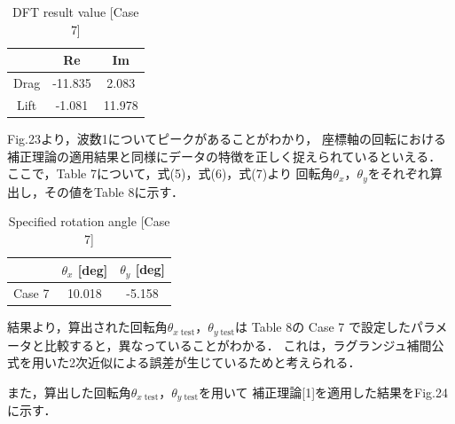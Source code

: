 \begin{table}[htbp]
  \begin{center}
    \caption{DFT result value [Case 7]}
    \begin{tabular}{|p{30mm}|p{20mm}|p{20mm}|}
      \hline
      \multicolumn{1}{|c|}{}     & \multicolumn{1}{|c|}{Re}      & \multicolumn{1}{|c|}{Im}     \\ \hline
      \multicolumn{1}{|c|}{Drag} & \multicolumn{1}{|c|}{-11.835} & \multicolumn{1}{|c|}{2.083}  \\ \hline
      \multicolumn{1}{|c|}{Lift} & \multicolumn{1}{|c|}{-1.081}  & \multicolumn{1}{|c|}{11.978} \\ \hline
    \end{tabular}
  \end{center}
\end{table}

\newpage
Fig.23より，波数1についてピークがあることがわかり，
座標軸の回転における補正理論の適用結果と同様にデータの特徴を正しく捉えられているといえる．
ここで，Table 7について，式(5)，式(6)，式(7)より
回転角$\theta_x$，$\theta_y$をそれぞれ算出し，その値をTable 8に示す．

\begin{table}[htbp]
  \begin{center}
    \caption{Specified rotation angle [Case 7]}
    \begin{tabular}{|p{30mm}|p{20mm}|p{20mm}|}
      \hline
      \multicolumn{1}{|c|}{}       & \multicolumn{1}{|c|}{$\theta_x$ [deg]} & \multicolumn{1}{|c|}{$\theta_y$ [deg]} \\ \hline
      \multicolumn{1}{|c|}{Case 7} & \multicolumn{1}{|c|}{10.018}           & \multicolumn{1}{|c|}{-5.158}           \\ \hline
    \end{tabular}
  \end{center}
\end{table}


結果より，算出された回転角$\theta_{x\;\mathrm{test}}$，$\theta_{y\;\mathrm{test}}$は
Table 8の Case 7 で設定したパラメータと比較すると，異なっていることがわかる．
これは，ラグランジュ補間公式を用いた2次近似による誤差が生じているためと考えられる．

また，算出した回転角$\theta_{x\;\mathrm{test}}$，$\theta_{y\;\mathrm{test}}$を用いて
補正理論[1]を適用した結果をFig.24に示す．

